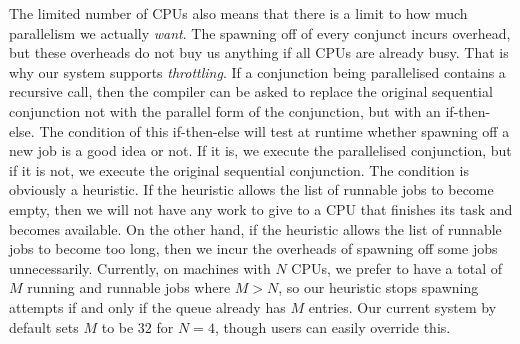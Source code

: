 The limited number of CPUs also means that
there is a limit to how much parallelism we actually \emph{want}.
The spawning off of every conjunct incurs overhead,
but these overheads do not buy us anything if all CPUs are already busy.
That is why our system supports \emph{throttling}.
If a conjunction being parallelised contains a recursive call,
then the compiler can be asked to replace the original sequential conjunction
not with the parallel form of the conjunction,
but with an if-then-else.
The condition of this if-then-else
will test at runtime
whether spawning off a new job is a good idea or not.
If it is, we execute the parallelised conjunction, but
if it is not, we execute the original sequential conjunction.
The condition is obviously a heuristic.
If the heuristic allows the list of runnable jobs to become empty,
then we will not have any work to give to a CPU
that finishes its task and becomes available.
On the other hand,
if the heuristic allows the list of runnable jobs to become too long,
then we incur the overheads of spawning off some jobs unnecessarily.
Currently, on machines with $N$ CPUs,
we prefer to have a total of $M$ running and runnable jobs where $M > N$,
so our heuristic stops spawning attempts
if and only if the queue already has $M$ entries.
Our current system by default sets $M$ to be $32$ for $N = 4$,
though users can easily override this.




